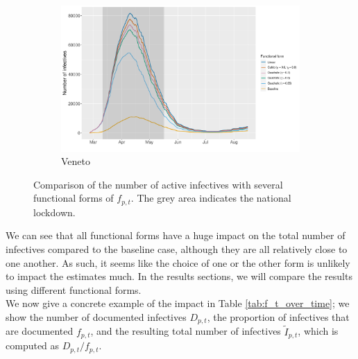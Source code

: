 \documentclass[12pt]{article}
\begin{document}
    \begin{figure}[H]\ContinuedFloat
	    \begin{subfigure}{\textwidth}
	      \centering
	      \includegraphics[width=0.95\linewidth]{output/undocumented_comparison_VEN.pdf}
	      \caption{Veneto}
	      \label{fig:undoc_VEN}
	    \end{subfigure}
	    \caption{Comparison of the number of active infectives with several functional forms of $f_{p,t}$. The grey area indicates the national lockdown.}
	    \label{fig:undoc_absolute}
    \end{figure}
	
	We can see that all functional forms have a huge impact on the total number of infectives compared to the baseline case, although they are all relatively close to one another. As such, it seems like the choice of one or the other form is unlikely to impact the estimates much. In the results sections, we will compare the results using different functional forms. \\
	
	We now give a concrete example of the impact in Table \ref{tab:f_t_over_time}; we show the number of documented infectives $D_{p,t}$, the proportion of infectives that are documented $f_{p,t}$, and the resulting total number of infectives $\tilde{I}_{p,t}$, which is computed as $D_{p,t} / f_{p,t}$.
	
\end{document}
